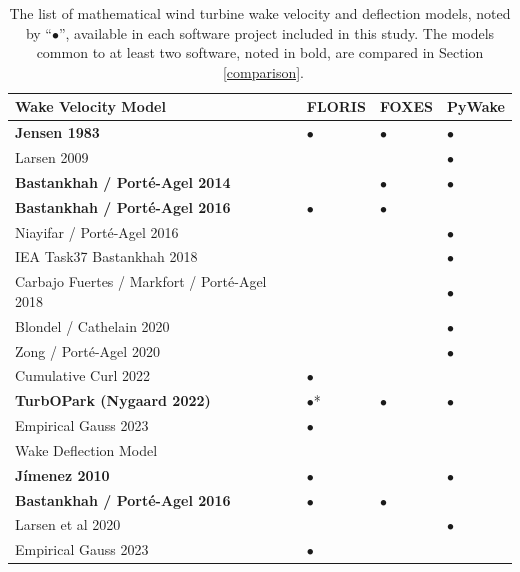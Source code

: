 \documentclass{iopconfser}
\begin{document}
\begin{table}[!hb]
\caption{The list of mathematical wind turbine wake velocity and deflection models, noted by ``$\bullet$'', available in each software project included in this study. The models common to at least two software, noted in bold, are compared in Section ~\ref{comparison}.}
\label{tab:models}
\centering
\begin{tabular}{llll}
\toprule
{Wake Velocity Model} & {FLORIS} & {FOXES} & {PyWake} \\ \midrule
\textbf{Jensen 1983}\cite{jensen1983note}                               & $\bullet$ & $\bullet$ & $\bullet$  \\
Larsen 2009\cite{larsen2009simple}                                      &           &           & $\bullet$  \\
\textbf{Bastankhah / Porté-Agel 2014}\cite{bastankhah2014new}           &           & $\bullet$ & $\bullet$  \\
\textbf{Bastankhah / Porté-Agel 2016}\cite{bastankhah2016experimental}  & $\bullet$ & $\bullet$ &            \\
Niayifar / Porté-Agel 2016\cite{niayifar2016analytical}                 &           &           & $\bullet$  \\
IEA Task37 Bastankhah 2018\cite{iea2018wake}                            &           &           & $\bullet$  \\
Carbajo Fuertes / Markfort / Porté-Agel 2018\cite{fuertes2018wind}      &           &           & $\bullet$  \\
Blondel / Cathelain 2020\cite{blondel2020alternative}                   &           &           & $\bullet$  \\
Zong / Porté-Agel 2020\cite{zong2020momentum}                           &           &           & $\bullet$  \\
Cumulative Curl 2022\cite{bay2023addressing}                            & $\bullet$ &           &            \\
\textbf{TurbOPark (Nygaard 2022)}\cite{nygaard2020modelling}            & $\bullet$*& $\bullet$ & $\bullet$  \\
Empirical Gauss 2023                                                    & $\bullet$ &           &            \\
\midrule
{Wake Deflection Model}                                                 &           &           &            \\
\midrule
\textbf{Jímenez 2010}\cite{jimenez2010application}                      & $\bullet$ &           & $\bullet$  \\
\textbf{Bastankhah / Porté-Agel 2016}\cite{bastankhah2016experimental}  & $\bullet$ & $\bullet$ &            \\
Larsen et al 2020\cite{larsen2020yaw}                                   &           &           & $\bullet$  \\
Empirical Gauss 2023                                                    & $\bullet$ &           &            \\
\bottomrule
\end{tabular}
\end{table}
\end{document}
